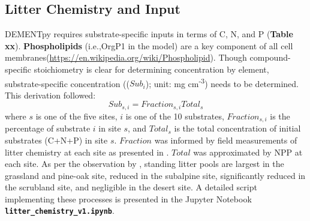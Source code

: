 \documentclass[letterpaper, 10pt]{article}
\begin{document}
\subsection{\large Litter Chemistry and Input}
DEMENTpy requires substrate-specific inputs in terms of C, N, and P (\textbf{Table xx}). \textbf{Phospholipids}
(i.e.,OrgP1 in the model) are a key component of all cell membranes(\url{https://en.wikipedia.org/wiki/Phospholipid}).
Though compound-specific stoichiometry is clear for determining concentration by element, substrate-specific
concentration (($Sub_i$); unit: mg cm\textsuperscript{-3}) needs to be determined. This derivation followed:
\begin{equation}
  Sub_{s,i} = Fraction_{s,i} Total_s 
\end{equation}
where $s$ is one of the five sites, $i$ is one of the 10 substrates, $Fraction_{s,i}$ is the percentage of substrate $i$
in site $s$, and $Total_s$ is the total concentration of initial substrates (C+N+P) in site $s$.  $Fraction$ was
informed by field measurements of litter chemistry at each site as presented in \citet{baker2017extracellular}. $Total$
was approximated by NPP at each site. As per the observation by \citet{baker2017extracellular}, standing litter pools
are largest in the grassland and pine-oak site, reduced in the subalpine site, significantly reduced in the scrubland
site, and negligible in the desert site. A detailed script implementing these processes is presented in the Jupyter
Notebook \textbf{\texttt{litter\_chemistry\_v1.ipynb}}.




\end{document}
